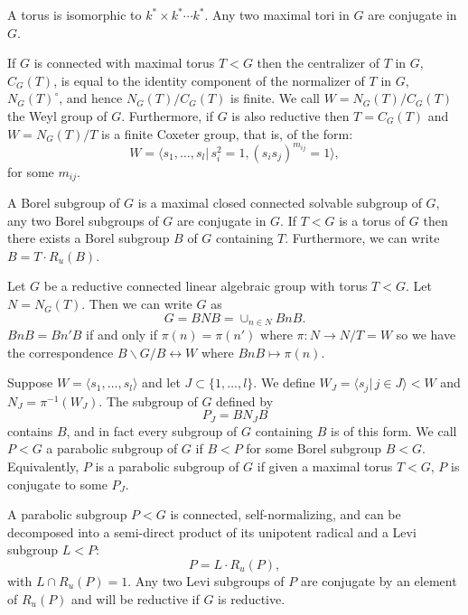 A torus is isomorphic to $k^*\times k^*\cdots k^*$. Any two maximal tori in $G$ are conjugate in $G$. 

If $G$ is connected with maximal torus $T<G$ then the centralizer of $T$ in $G$, $C_G(T)$, is equal to the identity component of the normalizer of $T$ in $G$, $N_G(T)^\circ$, and hence $N_G(T)/C_G(T)$ is finite. We call $W = N_G(T)/C_G(T)$ the Weyl group of $G$. Furthermore, if $G$ is also reductive then $T=C_G(T)$ and $W = N_G(T)/T$ is a finite Coxeter group, that is, of the form:
\begin{displaymath}
  W = \langle s_1, \ldots, s_l |\, s_i^2 = 1, (s_is_j)^{m_{ij}} = 1\rangle,
\end{displaymath}
for some $m_{ij}$.

A Borel subgroup of $G$ is a maximal closed connected solvable subgroup of $G$, any two Borel subgroups of $G$ are conjugate in $G$. If $T < G$ is a torus of $G$ then there exists a Borel subgroup $B$ of $G$ containing $T$. Furthermore, we can write $B = T\cdot R_u(B)$.

Let $G$ be a reductive connected linear algebraic group with torus $T < G$. Let $N = N_G(T)$. Then we can write $G$ as
\begin{displaymath}
	G = BNB = \cup_{n\in N}BnB.
\end{displaymath}
$BnB = Bn'B$ if and only if $\pi(n)=\pi(n')$ where $\pi:N\rightarrow N/T = W$ so we have the correspondence $B\backslash G/B \leftrightarrow W$ where $BnB \mapsto \pi(n)$.

Suppose $W = \langle s_1, \ldots, s_l\rangle$ and let $J \subset \{1, \ldots, l\}$. We define $W_J = \langle s_j |\, j\in J\rangle < W$ and $N_J = \pi^{-1}(W_J)$. The subgroup of $G$ defined by
\begin{displaymath}
	P_J = BN_JB
\end{displaymath}
contains $B$, and in fact every subgroup of $G$ containing $B$ is of this form. We call $P<G$ a parabolic subgroup of $G$ if $B<P$ for some Borel subgroup $B<G$. Equivalently, $P$ is a parabolic subgroup of $G$ if given a maximal torus $T<G$, $P$ is conjugate to some $P_J$. 

A parabolic subgroup $P<G$ is connected, self-normalizing, and can be decomposed into a semi-direct product of its unipotent radical and a Levi subgroup $L<P$:
\begin{displaymath}
	P = L\cdot R_u(P),
\end{displaymath}
with $L\cap R_u(P) = 1$. Any two Levi subgroups of $P$ are conjugate by an element of $R_u(P)$ and will be reductive if $G$ is reductive.

